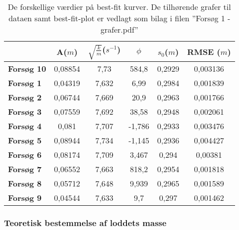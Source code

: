 \begin{table}[h]
\centering
\begin{tabular}{|l|c|c|c|c|c|}
\hline
\textbf{}          & \textbf{A}($m$) & \textbf{$\sqrt{\frac{k}{m}}$}($s^{-1}$) & \textbf{$\phi$} & \textbf{$s_0$}($m$) & \textbf{RMSE }($m$) \\ \hline
\textbf{Forsøg 10} & 0,08854    & 7,73                          & 584,8           & 0,2929         & 0,003136      \\ \hline
\textbf{Forsøg 1}  & 0,04319    & 7,632                         & 6,99            & 0,2984         & 0,001839      \\ \hline
\textbf{Forsøg 2}  & 0,06744    & 7,669                         & 20,9            & 0,2963         & 0,001766      \\ \hline
\textbf{Forsøg 3}  & 0,07559    & 7,692                         & 38,58           & 0,2948         & 0,002061      \\ \hline
\textbf{Forsøg 4}  & 0,081      & 7,707                         & -1,786          & 0,2933         & 0,003476      \\ \hline
\textbf{Forsøg 5}  & 0,08944    & 7,734                         & -1,145          & 0,2936         & 0,004427      \\ \hline
\textbf{Forsøg 6}  & 0,08174    & 7,709                         & 3,467           & 0,294          & 0,00381       \\ \hline
\textbf{Forsøg 7}  & 0,06552    & 7,663                         & 818,2           & 0,2954         & 0,001818      \\ \hline
\textbf{Forsøg 8}  & 0,05712    & 7,648                         & 9,939           & 0,2965         & 0,001589      \\ \hline
\textbf{Forsøg 9}  & 0,04544    & 7,633                         & 9,7             & 0,297          & 0,001462      \\ \hline
\end{tabular}

\caption{De forskellige værdier på best-fit kurver. De tilhørende grafer til dataen samt best-fit-plot er vedlagt som bilag i filen ''Forsøg 1 - grafer.pdf''}
\label{tabel: bestfitkurver forsog 1}
\end{table}

\subsubsection{Teoretisk bestemmelse af loddets masse}

